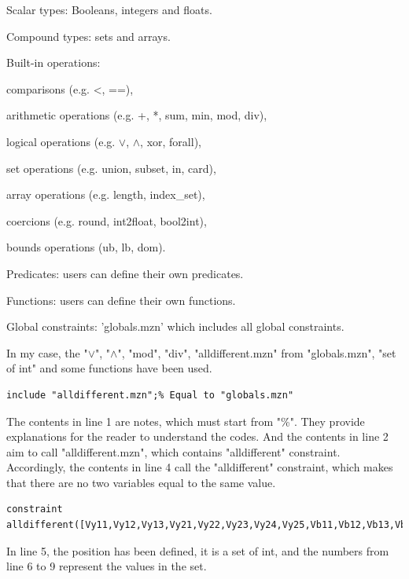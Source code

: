 \begin{compactenum}
  \item Scalar types: Booleans, integers and floats.
  \item Compound types: sets and arrays.
  \item Built-in operations: 
  \begin{compactitem}
  \item comparisons (e.g. <, ==),
  \item arithmetic operations (e.g. +, *, sum, min, mod, div),
  \item logical operations (e.g. $\vee$, $\wedge$, xor, forall),
  \item set operations (e.g. union, subset, in, card),
  \item array operations (e.g. length, index\_set),
  \item coercions (e.g. round, int2float, bool2int), 
  \item bounds operations (ub, lb, dom).
  \end{compactitem}
  \item Predicates: users can define their own predicates.
  \item Functions: users can define their own functions.
  \item Global constraints: 'globals.mzn' which includes all global constraints.
\end{compactenum}
In my case, the "$\vee$", "$\wedge$", "mod", "div", "alldifferent.mzn" from "globals.mzn", "set of int" and some functions have been used.
\begin{lstlisting}[language=minizinc,firstnumber=1]
% A simple Minizinc example 
include "alldifferent.mzn";% Equal to "globals.mzn"
\end{lstlisting}
The contents in line 1 are notes, which must start from "\%". They provide explanations for the reader to understand the codes. And the contents in line 2 aim to call "alldifferent.mzn", which contains "alldifferent" constraint. Accordingly, the contents in line 4 call the "alldifferent" constraint, which makes that there are no two variables equal to the same value. 
\begin{lstlisting}[language=minizinc,firstnumber=3]
%all the Vunits are different
constraint alldifferent([Vy11,Vy12,Vy13,Vy21,Vy22,Vy23,Vy24,Vy25,Vb11,Vb12,Vb13,Vb14,Vb15,Vb21,Vb22,Vb23,Vb24,Vg11,Vg12,Vg13,Vg14,Vg21,Vg22,Vg23,Vr11,Vr12,Vr13,Vr14,Vr21,Vr22,Vr23,Vr24]);
\end{lstlisting}
In line 5, the position has been defined, it is a set of int, and the numbers from line 6 to 9 represent the values in the set.
